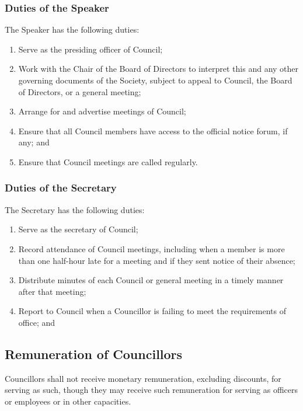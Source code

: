 \subsubsection{Duties of the Speaker}
The Speaker has the following duties:
\begin{enumerate}
  \item Serve as the presiding officer of Council;
  \item Work with the Chair of the Board of Directors to interpret this and any
      other governing documents of the Society, subject to appeal to 
      Council, the Board of Directors, or a general meeting;
  \item Arrange for and advertise meetings of Council;
  \item Ensure that all Council members have access to the official
      notice forum, if any; and
  \item Ensure that Council meetings are called regularly.
\end{enumerate}

\subsubsection{Duties of the Secretary}
The Secretary has the following duties:
\begin{enumerate}
  \item Serve as the secretary of Council;
  \item Record attendance of Council meetings, including when a
      member is more than one half-hour late for a meeting and if they sent
      notice of their absence;
  \item Distribute minutes of each Council or general meeting in a
      timely manner after that meeting;
  \item Report to Council when a Councillor is failing to meet the
      requirements of office; and
\end{enumerate}

\subsection{Remuneration of Councillors}

Councillors shall not receive monetary remuneration, excluding discounts, 
for serving as such, though they may receive such remuneration for serving 
as officers or employees or in other capacities.
